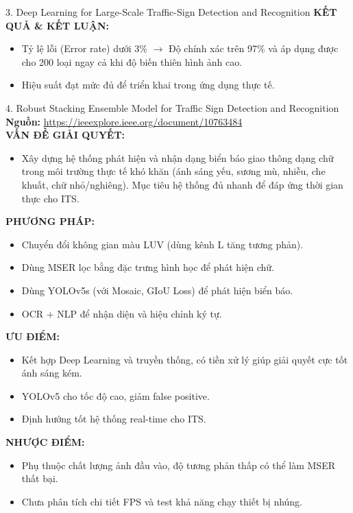 \documentclass[12pt,a4paper]{article}
\newcommand{\subheading}[1]{\vspace{0.3cm}\noindent\textbf{\textcolor{primary}{\MakeUppercase{#1}:}}\par\vspace{0.1cm}}
\begin{document}
\begin{paperbox}{3. Deep Learning for Large-Scale Traffic-Sign Detection and Recognition}
    \subheading{Kết quả \& Kết luận}
    \begin{itemize}
        \item Tỷ lệ lỗi (Error rate) dưới 3\% $\rightarrow$ Độ chính xác trên 97\% và áp dụng được cho 200 loại ngay cả khi độ biến thiên hình ảnh cao.
        \item Hiệu suất đạt mức đủ để triển khai trong ứng dụng thực tế.
    \end{itemize}
\end{paperbox}

\vspace{0.5cm}

\begin{paperbox}{4. Robust Stacking Ensemble Model for Traffic Sign Detection and Recognition}
    \textbf{Nguồn:} \url{https://ieeexplore.ieee.org/document/10763484}\\

    \subheading{Vấn đề giải quyết}
    \begin{itemize}
        \item Xây dựng hệ thống phát hiện và nhận dạng biển báo giao thông dạng chữ trong môi trường thực tế khó khăn (ánh sáng yếu, sương mù, nhiễu, che khuất, chữ nhỏ/nghiêng). Mục tiêu hệ thống đủ nhanh để đáp ứng thời gian thực cho ITS.
    \end{itemize}

    \subheading{Phương pháp}
    \begin{itemize}
        \item Chuyển đổi không gian màu LUV (dùng kênh L tăng tương phản).
        \item Dùng MSER lọc bằng đặc trưng hình học để phát hiện chữ.
        \item Dùng YOLOv5s (với Mosaic, GIoU Loss) để phát hiện biển báo.
        \item OCR + NLP để nhận diện và hiệu chỉnh ký tự.
    \end{itemize}

    \subheading{Ưu điểm}
    \begin{itemize}
        \item Kết hợp Deep Learning và truyền thống, có tiền xử lý giúp giải quyết cực tốt ánh sáng kém.
        \item YOLOv5 cho tốc độ cao, giảm false positive.
        \item Định hướng tốt hệ thống real-time cho ITS.
    \end{itemize}

    \subheading{Nhược điểm}
    \begin{itemize}
        \item Phụ thuộc chất lượng ảnh đầu vào, độ tương phản thấp có thể làm MSER thất bại.
        \item Chưa phân tích chi tiết FPS và test khả năng chạy thiết bị nhúng.
    \end{itemize}


\end{paperbox}
\end{document}
